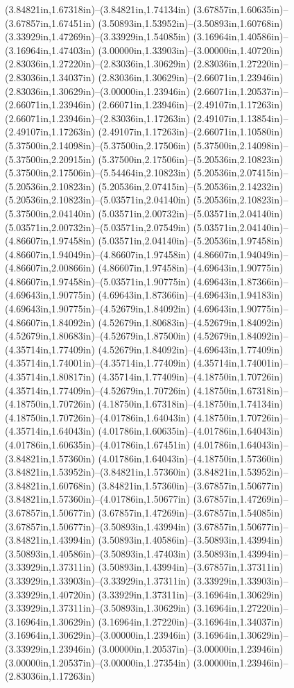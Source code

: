 (3.84821in,1.67318in)--(3.84821in,1.74134in) (3.67857in,1.60635in)--(3.67857in,1.67451in) (3.50893in,1.53952in)--(3.50893in,1.60768in) (3.33929in,1.47269in)--(3.33929in,1.54085in) (3.16964in,1.40586in)--(3.16964in,1.47403in) (3.00000in,1.33903in)--(3.00000in,1.40720in) (2.83036in,1.27220in)--(2.83036in,1.30629in) (2.83036in,1.27220in)--(2.83036in,1.34037in) (2.83036in,1.30629in)--(2.66071in,1.23946in) (2.83036in,1.30629in)--(3.00000in,1.23946in) (2.66071in,1.20537in)--(2.66071in,1.23946in) (2.66071in,1.23946in)--(2.49107in,1.17263in) (2.66071in,1.23946in)--(2.83036in,1.17263in) (2.49107in,1.13854in)--(2.49107in,1.17263in) (2.49107in,1.17263in)--(2.66071in,1.10580in) (5.37500in,2.14098in)--(5.37500in,2.17506in) (5.37500in,2.14098in)--(5.37500in,2.20915in) (5.37500in,2.17506in)--(5.20536in,2.10823in) (5.37500in,2.17506in)--(5.54464in,2.10823in) (5.20536in,2.07415in)--(5.20536in,2.10823in) (5.20536in,2.07415in)--(5.20536in,2.14232in) (5.20536in,2.10823in)--(5.03571in,2.04140in) (5.20536in,2.10823in)--(5.37500in,2.04140in) (5.03571in,2.00732in)--(5.03571in,2.04140in) (5.03571in,2.00732in)--(5.03571in,2.07549in) (5.03571in,2.04140in)--(4.86607in,1.97458in) (5.03571in,2.04140in)--(5.20536in,1.97458in) (4.86607in,1.94049in)--(4.86607in,1.97458in) (4.86607in,1.94049in)--(4.86607in,2.00866in) (4.86607in,1.97458in)--(4.69643in,1.90775in) (4.86607in,1.97458in)--(5.03571in,1.90775in) (4.69643in,1.87366in)--(4.69643in,1.90775in) (4.69643in,1.87366in)--(4.69643in,1.94183in) (4.69643in,1.90775in)--(4.52679in,1.84092in) (4.69643in,1.90775in)--(4.86607in,1.84092in) (4.52679in,1.80683in)--(4.52679in,1.84092in) (4.52679in,1.80683in)--(4.52679in,1.87500in) (4.52679in,1.84092in)--(4.35714in,1.77409in) (4.52679in,1.84092in)--(4.69643in,1.77409in) (4.35714in,1.74001in)--(4.35714in,1.77409in) (4.35714in,1.74001in)--(4.35714in,1.80817in) (4.35714in,1.77409in)--(4.18750in,1.70726in) (4.35714in,1.77409in)--(4.52679in,1.70726in) (4.18750in,1.67318in)--(4.18750in,1.70726in) (4.18750in,1.67318in)--(4.18750in,1.74134in) (4.18750in,1.70726in)--(4.01786in,1.64043in) (4.18750in,1.70726in)--(4.35714in,1.64043in) (4.01786in,1.60635in)--(4.01786in,1.64043in) (4.01786in,1.60635in)--(4.01786in,1.67451in) (4.01786in,1.64043in)--(3.84821in,1.57360in) (4.01786in,1.64043in)--(4.18750in,1.57360in) (3.84821in,1.53952in)--(3.84821in,1.57360in) (3.84821in,1.53952in)--(3.84821in,1.60768in) (3.84821in,1.57360in)--(3.67857in,1.50677in) (3.84821in,1.57360in)--(4.01786in,1.50677in) (3.67857in,1.47269in)--(3.67857in,1.50677in) (3.67857in,1.47269in)--(3.67857in,1.54085in) (3.67857in,1.50677in)--(3.50893in,1.43994in) (3.67857in,1.50677in)--(3.84821in,1.43994in) (3.50893in,1.40586in)--(3.50893in,1.43994in) (3.50893in,1.40586in)--(3.50893in,1.47403in) (3.50893in,1.43994in)--(3.33929in,1.37311in) (3.50893in,1.43994in)--(3.67857in,1.37311in) (3.33929in,1.33903in)--(3.33929in,1.37311in) (3.33929in,1.33903in)--(3.33929in,1.40720in) (3.33929in,1.37311in)--(3.16964in,1.30629in) (3.33929in,1.37311in)--(3.50893in,1.30629in) (3.16964in,1.27220in)--(3.16964in,1.30629in) (3.16964in,1.27220in)--(3.16964in,1.34037in) (3.16964in,1.30629in)--(3.00000in,1.23946in) (3.16964in,1.30629in)--(3.33929in,1.23946in) (3.00000in,1.20537in)--(3.00000in,1.23946in) (3.00000in,1.20537in)--(3.00000in,1.27354in) (3.00000in,1.23946in)--(2.83036in,1.17263in) 